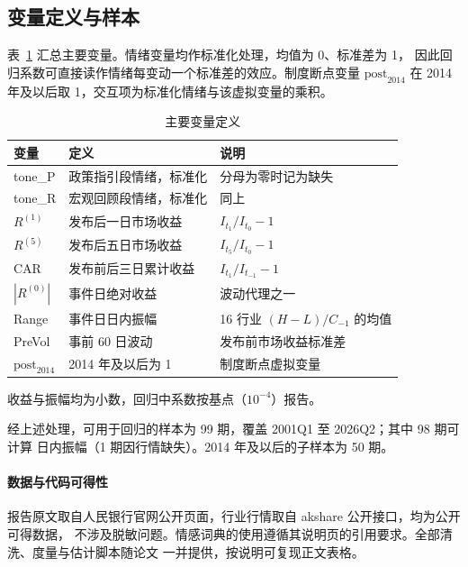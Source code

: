 \subsection{变量定义与样本}

表~\ref{tab:var} 汇总主要变量。情绪变量均作标准化处理，均值为 0、标准差为 1，
因此回归系数可直接读作情绪每变动一个标准差的效应。制度断点变量 $\text{post}_{2014}$
在 2014 年及以后取 1，交互项为标准化情绪与该虚拟变量的乘积。

\begin{table}[htbp]
\centering
\small
\begin{threeparttable}
\caption{主要变量定义}
\label{tab:var}
\begin{tabular}{lll}
\toprule
变量 & 定义 & 说明 \\
\midrule
tone\_P        & 政策指引段情绪，标准化                 & 分母为零时记为缺失 \\
tone\_R        & 宏观回顾段情绪，标准化                 & 同上 \\
$R^{(1)}$      & 发布后一日市场收益                     & $I_{t_1}/I_{t_0}-1$ \\
$R^{(5)}$      & 发布后五日市场收益                     & $I_{t_5}/I_{t_0}-1$ \\
CAR            & 发布前后三日累计收益                   & $I_{t_1}/I_{t_{-1}}-1$ \\
$|R^{(0)}|$    & 事件日绝对收益                         & 波动代理之一 \\
Range          & 事件日日内振幅                         & 16 行业 $(H-L)/C_{-1}$ 的均值 \\
PreVol         & 事前 60 日波动                         & 发布前市场收益标准差 \\
$\text{post}_{2014}$ & 2014 年及以后为 1               & 制度断点虚拟变量 \\
\bottomrule
\end{tabular}
\begin{tablenotes}[flushleft]
\footnotesize
\item 收益与振幅均为小数，回归中系数按基点（$10^{-4}$）报告。
\end{tablenotes}
\end{threeparttable}
\end{table}

经上述处理，可用于回归的样本为 99 期，覆盖 2001Q1 至 2026Q2；其中 98 期可计算
日内振幅（1 期因行情缺失）。2014 年及以后的子样本为 50 期。

\paragraph{数据与代码可得性}
报告原文取自人民银行官网公开页面，行业行情取自 akshare 公开接口，均为公开可得数据，
不涉及脱敏问题。情感词典的使用遵循其说明页的引用要求。全部清洗、度量与估计脚本随论文
一并提供，按说明可复现正文表格。
